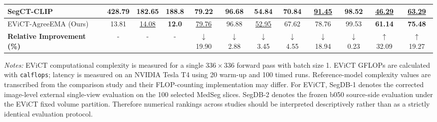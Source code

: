\begin{table}[t]
{\begin{tabular}{lccc|cccc|cccc}
SegCT-CLIP & 428.79 & 182.65 & 188.8 & 79.22 & 96.68 & \textbf{54.84} & \textbf{70.84} & \underline{91.45} & 98.52 & \underline{46.29} & \underline{63.29} \\
\midrule
EViCT-AgreeEMA (Ours) & 13.81 & \underline{14.08} & \textbf{12.0} & \underline{79.76} & 96.88 & \underline{52.95} & 67.62 & 78.76 & 99.53 & \textbf{61.14} & \textbf{75.48} \\
\midrule
\textbf{Relative Improvement (\%)} & - & - & - & $\downarrow$ 19.90 & $\downarrow$ 2.88 & $\downarrow$ 3.45 & $\downarrow$ 4.55 & $\downarrow$ 18.94 & $\downarrow$ 0.23 & $\uparrow$ 32.09 & $\uparrow$ 19.27 \\
\bottomrule
\end{tabular}%
}
\begin{minipage}{0.99\textwidth}
\footnotesize \textit{Notes:} EViCT computational complexity is measured for a single $336\times336$ forward pass with batch size 1. EViCT GFLOPs are calculated with \texttt{calflops}; latency is measured on an NVIDIA Tesla T4 using 20 warm-up and 100 timed runs. Reference-model complexity values are transcribed from the comparison study and their FLOP-counting implementation may differ. For EViCT, SegDB-1 denotes the corrected image-level external single-view evaluation on the 100 selected MedSeg slices. SegDB-2 denotes the frozen b050 source-side evaluation under the EViCT fixed volume partition. Therefore numerical rankings across studies should be interpreted descriptively rather than as a strictly identical evaluation protocol.
\end{minipage}
\end{table}
